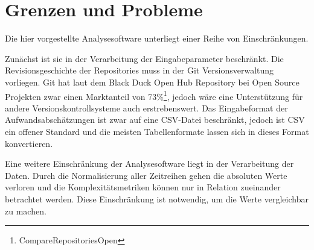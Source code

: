 \section{Grenzen und Probleme}\label{grenzen-und-probleme}

Die hier vorgestellte Analysesoftware unterliegt einer Reihe von
Einschränkungen.

Zunächst ist sie in der Verarbeitung der Eingabeparameter beschränkt.
Die Revisionsgeschichte der Repositories muss in der Git
Versionsverwaltung vorliegen. Git hat laut dem Black Duck Open Hub
Repository bei Open Source Projekten zwar einen Marktanteil von
73\%\footnote{CompareRepositoriesOpen}, jedoch wäre eine Unterstützung
für andere Versionskontrollsysteme auch erstrebenswert. Das
Eingabeformat der Aufwandsabschätzungen ist zwar auf eine CSV-Datei
beschränkt, jedoch ist CSV ein offener Standard und die meisten
Tabellenformate lassen sich in dieses Format konvertieren.

Eine weitere Einschränkung der Analysesoftware liegt in der Verarbeitung
der Daten. Durch die Normalisierung aller Zeitreihen gehen die absoluten
Werte verloren und die Komplexitätsmetriken können nur in Relation
zueinander betrachtet werden. Diese Einschränkung ist notwendig, um die
Werte vergleichbar zu machen.

